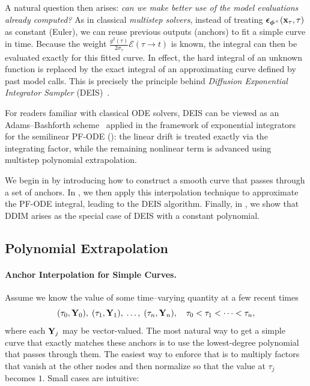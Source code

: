 A natural question then arises: \emph{can we make better use of the model evaluations already
computed?} As in classical \emph{multistep solvers}, instead of treating
${\bm{\epsilon}}_{\bm{\phi}^\times}({\mathbf{x}}_\tau,\tau)$ as constant (Euler), we can reuse previous outputs (anchors) to fit a
simple curve in time. Because the weight
$\tfrac{g^2(\tau)}{2\sigma_\tau}\mathcal{E}(\tau \to  t)$ is known, the integral can then be
evaluated exactly for this fitted curve. In effect, the hard integral of an unknown function
is replaced by the exact integral of an approximating curve defined by past model calls. This
is precisely the principle behind \emph{Diffusion Exponential Integrator Sampler} (DEIS)~\citep{zhang2022fast}.

For readers familiar with classical ODE solvers, DEIS can be viewed as an 
Adams--Bashforth scheme~\citep{iserles2009first} applied in the framework of 
exponential integrators for the semilinear PF-ODE (): 
the linear drift is treated exactly via the integrating factor, while the 
remaining nonlinear term is advanced using multistep polynomial extrapolation.

We begin in  by introducing how to construct a smooth curve that passes through a set of anchors. In , we then apply this interpolation technique to approximate the PF-ODE integral, leading to the DEIS algorithm. Finally, in , we show that DDIM arises as the special case of DEIS with a constant polynomial.


\subsection{Polynomial Extrapolation}
\label{subsec:poly-extrapolation}

\paragraph{Anchor Interpolation for Simple Curves.}
Assume we know the value of some time–varying quantity at a few recent times
\[
(\tau_0,{\mathbf{Y}}_0),\;(\tau_1,{\mathbf{Y}}_1),\;\ldots,\;(\tau_n,{\mathbf{Y}}_n),
\quad \tau_0<\tau_1<\cdots<\tau_n,
\]
where each ${\mathbf{Y}}_j$ may be vector-valued. The most natural way to get a simple curve that
exactly matches these anchors is to use the lowest-degree polynomial that passes
through them. The easiest way to enforce that is to multiply factors that vanish at the other nodes and then normalize so that the value at $\tau_j$ becomes $1$. Small cases are intuitive:

